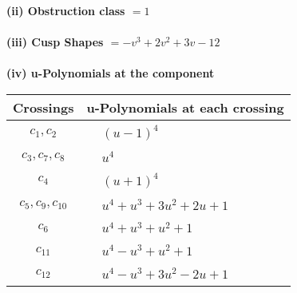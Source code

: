 \documentclass[1p]{elsarticle_modified}
\theoremstyle{definition}
\begin{document}
\flushleft \textbf{(ii) Obstruction class $= 1$}\\~\\
\flushleft \textbf{(iii) Cusp Shapes $= - v^3+2 v^2+3 v-12$}\\~\\
\newpage\renewcommand{\arraystretch}{1}
\flushleft \textbf{(iv) u-Polynomials at the component}\newline \\
\begin{tabular}{m{50pt}|m{274pt}}
Crossings & \hspace{64pt}u-Polynomials at each crossing \\
\hline $$\begin{aligned}c_{1},c_{2}\end{aligned}$$&$\begin{aligned}
&(u-1)^4
\end{aligned}$\\
\hline $$\begin{aligned}c_{3},c_{7},c_{8}\end{aligned}$$&$\begin{aligned}
&u^4
\end{aligned}$\\
\hline $$\begin{aligned}c_{4}\end{aligned}$$&$\begin{aligned}
&(u+1)^4
\end{aligned}$\\
\hline $$\begin{aligned}c_{5},c_{9},c_{10}\end{aligned}$$&$\begin{aligned}
&u^4+u^3+3 u^2+2 u+1
\end{aligned}$\\
\hline $$\begin{aligned}c_{6}\end{aligned}$$&$\begin{aligned}
&u^4+u^3+u^2+1
\end{aligned}$\\
\hline $$\begin{aligned}c_{11}\end{aligned}$$&$\begin{aligned}
&u^4- u^3+u^2+1
\end{aligned}$\\
\hline $$\begin{aligned}c_{12}\end{aligned}$$&$\begin{aligned}
&u^4- u^3+3 u^2-2 u+1
\end{aligned}$\\
\hline
\end{tabular}\\~\\
\end{document}

